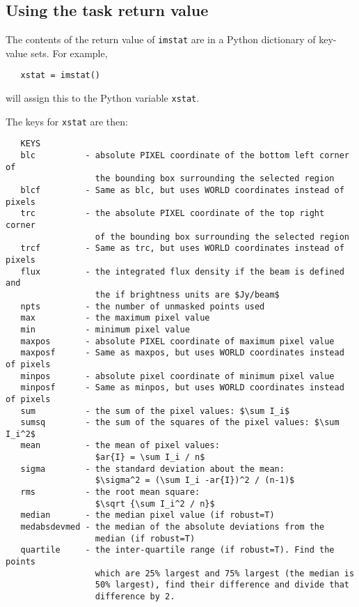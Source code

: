 \subsection{Using the task return value}
\label{section:analysis.imstat.xstat}

The contents of the return value of {\tt imstat} are in a Python
dictionary of key-value sets.  For example,
\small
\begin{verbatim}
   xstat = imstat()
\end{verbatim}
\normalsize
will assign this to the Python variable {\tt xstat}.

The keys for {\tt xstat} are then:
\small
\begin{verbatim}
   KEYS
   blc          - absolute PIXEL coordinate of the bottom left corner of 
                  the bounding box surrounding the selected region
   blcf         - Same as blc, but uses WORLD coordinates instead of pixels
   trc          - the absolute PIXEL coordinate of the top right corner 
                  of the bounding box surrounding the selected region
   trcf         - Same as trc, but uses WORLD coordinates instead of pixels
   flux         - the integrated flux density if the beam is defined and 
                  the if brightness units are $Jy/beam$
   npts         - the number of unmasked points used
   max          - the maximum pixel value
   min          - minimum pixel value
   maxpos       - absolute PIXEL coordinate of maximum pixel value
   maxposf      - Same as maxpos, but uses WORLD coordinates instead of pixels
   minpos       - absolute pixel coordinate of minimum pixel value
   minposf      - Same as minpos, but uses WORLD coordinates instead of pixels
   sum          - the sum of the pixel values: $\sum I_i$
   sumsq        - the sum of the squares of the pixel values: $\sum I_i^2$
   mean         - the mean of pixel values: 
                  $ar{I} = \sum I_i / n$
   sigma        - the standard deviation about the mean: 
                  $\sigma^2 = (\sum I_i -ar{I})^2 / (n-1)$
   rms          - the root mean square: 
                  $\sqrt {\sum I_i^2 / n}$
   median       - the median pixel value (if robust=T)
   medabsdevmed - the median of the absolute deviations from the 
                  median (if robust=T)    
   quartile     - the inter-quartile range (if robust=T). Find the points 
                  which are 25% largest and 75% largest (the median is 
                  50% largest), find their difference and divide that 
                  difference by 2.
\end{verbatim}
\normalsize

